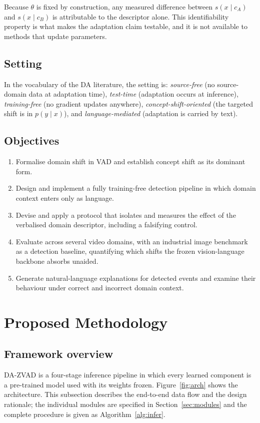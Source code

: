 \documentclass[a4paper,fleqn]{cas-sc}
\begin{document}
Because $\theta$ is fixed by construction, any measured difference between
$s(x\mid c_A)$ and $s(x\mid c_B)$ is attributable to the descriptor alone. This
identifiability property is what makes the adaptation claim testable, and it is
not available to methods that update parameters.

\subsection{Setting}
In the vocabulary of the DA literature, the setting is: \emph{source-free} (no
source-domain data at adaptation time), \emph{test-time} (adaptation occurs at
inference), \emph{training-free} (no gradient updates anywhere),
\emph{concept-shift-oriented} (the targeted shift is in $p(y\mid x)$), and
\emph{language-mediated} (adaptation is carried by text).

\subsection{Objectives}
\begin{enumerate}[O1.]
  \item Formalise domain shift in VAD and establish concept shift as its dominant
        form.
  \item Design and implement a fully training-free detection pipeline in which
        domain context enters only as language.
  \item Devise and apply a protocol that isolates and measures the effect of the
        verbalised domain descriptor, including a falsifying control.
  \item Evaluate across several video domains, with an industrial image
        benchmark as a detection baseline, quantifying which shifts the frozen
        vision-language backbone absorbs unaided.
  \item Generate natural-language explanations for detected events and examine
        their behaviour under correct and incorrect domain context.
\end{enumerate}

\section{Proposed Methodology}
\label{sec:method}

\subsection{Framework overview}
DA-ZVAD is a four-stage inference pipeline in which every learned component is a
pre-trained model used with its weights frozen. Figure~\ref{fig:arch} shows the
architecture. This subsection describes the end-to-end data flow and the design
rationale; the individual modules are specified in Section~\ref{sec:modules} and
the complete procedure is given as Algorithm~\ref{alg:infer}.
\end{document}
